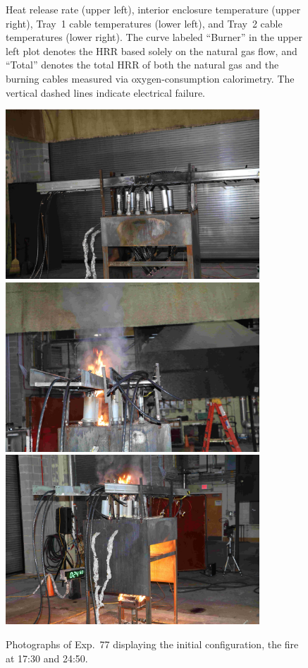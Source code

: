 \begin{figure}[H]
\caption[HRR and temperatures of Exp.~77]{Heat release rate (upper left), interior enclosure temperature (upper right), Tray~1 cable temperatures (lower left), and Tray~2 cable temperatures (lower right). The curve labeled ``Burner'' in the upper left plot denotes the HRR based solely on the natural gas flow, and ``Total'' denotes the total HRR of both the natural gas and the burning cables measured via oxygen-consumption calorimetry. The vertical dashed lines indicate electrical failure.}
\label{fig:Test_77}
\end{figure}

\begin{figure}[p]
\centering
\includegraphics[height=2.50in]{../FIGURES/Test_77_Photo_1} \\ \vspace{0.1in}
\includegraphics[height=2.50in]{../FIGURES/Test_77_Photo_2} \\ \vspace{0.1in}
\includegraphics[height=2.50in]{../FIGURES/Test_77_Photo_3}
\caption[Photographs of Exp.~77]{Photographs of Exp.~77 displaying the initial configuration, the fire at 17:30 and 24:50.}
\label{fig:Test_77_photos}
\end{figure}


